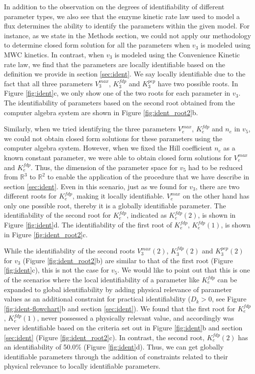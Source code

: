 \documentclass[10pt]{article}
\begin{document}
	In addition to the observation on the degrees of identifiability of different parameter types, we also see that the enzyme kinetic rate law used to model a flux determines the ability to identify the parameters within the given model. For instance, as we state in the Methods section, we could not apply our methodology to determine closed form solution for all the parameters when $v_3$ is modeled using MWC kinetics. In contrast, when $v_3$ is modeled using the Convenience Kinetic rate law, we find that the parameters are locally identifiable based on the definition we provide in section \ref{sec:ident}. We say locally identifiable due to the fact that all three parameters $V_3^{max}$, $K_3^{fdp}$ and $K_3^{pep}$ have two possible roots. In Figure \ref{fig:ident}c, we only show one of the two roots for each parameter in $v_3$. The identifiability of parameters based on the second root obtained from the computer algebra system are shown in Figure \ref{fig:ident_root2}b. 
	
	Similarly, when we tried identifying the three parameters $V_e^{max}$, $K_e^{fdp}$ and $n_e$ in $v_5$, we could not obtain closed form solutions for these parameters using the computer algebra system. However, when we fixed the Hill coefficient $n_e$ as a known constant parameter, we were able to obtain closed form solutions for $V_e^{max}$ and $K_e^{fdp}$. Thus, the dimension of the parameter space for $v_5$ had to be reduced from $\mathbb{R}^3$ to $\mathbb{R}^2$ to enable the application of the procedure that we have describe in section \ref{sec:ident}. Even in this scenario, just as we found for $v_3$, there are two different roots for $K_e^{fdp}$, making it locally identifiable. $V_e^{max}$ on the other hand has only one possible root, thereby it is a globally identifiable parameter. The identifiability of the second root for $K_e^{fdp}$, indicated as $K_e^{fdp}(2)$, is shown in Figure \ref{fig:ident}d. The identifiability of the first root of $K_e^{fdp}$, $K_e^{fdp}(1)$, is shown in Figure \ref{fig:ident_root2}c.
	
	While the identifiability of the second roots $V_3^{max}(2)$, $K_3^{fdp}(2)$ and $K_3^{pep}(2)$ for $v_3$ (Figure \ref{fig:ident_root2}b) are similar to that of the first root (Figure \ref{fig:ident}c), this is not the case for $v_5$. We would like to point out that this is one of the scenarios where the local identifiability of a parameter like $K_e^{fdp}$ can be expanded to global identifiability by adding physical relevance of parameter values as an additional constraint for practical identifiability ($D_k>0$, see Figure \ref{fig:ident-flowchart}b and section \ref{sec:ident}). We found that the first root for $K_e^{fdp}$, $K_e^{fdp}(1)$, never possessed a physically relevant value, and accordingly was never identifiable based on the criteria set out in Figure \ref{fig:ident}b and section \ref{sec:ident} (Figure \ref{fig:ident_root2}c). In contrast, the second root, $K_e^{fdp}(2)$ has an identifiability of 50.0\% (Figure \ref{fig:ident}d). Thus, we can get globally identifiable parameters through the addition of constraints related to their physical relevance to locally identifiable parameters. 
	
\end{document}
